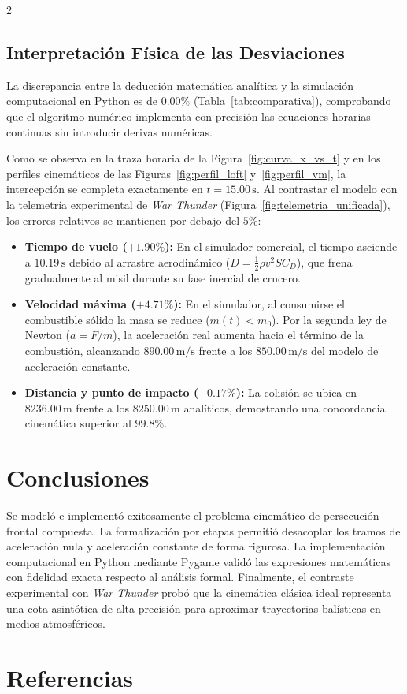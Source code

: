 \documentclass[11pt,letterpaper]{article}
\begin{document}
\begin{multicols}{2}

\subsection{Interpretación Física de las Desviaciones}
La discrepancia entre la deducción matemática analítica y la simulación computacional en Python es de $0.00\%$ (Tabla~\ref{tab:comparativa}), comprobando que el algoritmo numérico implementa con precisión las ecuaciones horarias continuas sin introducir derivas numéricas.

Como se observa en la traza horaria de la Figura~\ref{fig:curva_x_vs_t} y en los perfiles cinemáticos de las Figuras~\ref{fig:perfil_loft} y~\ref{fig:perfil_vm}, la intercepción se completa exactamente en $t = 15.00\,\text{s}$. Al contrastar el modelo con la telemetría experimental de \textit{War Thunder} (Figura~\ref{fig:telemetria_unificada}), los errores relativos se mantienen por debajo del $5\%$:
\begin{itemize}[leftmargin=1.2em]
    \item \textbf{Tiempo de vuelo ($+1.90\%$):} En el simulador comercial, el tiempo asciende a $10.19\,\text{s}$ debido al arrastre aerodinámico ($D = \frac{1}{2}\rho v^2 S C_D$), que frena gradualmente al misil durante su fase inercial de crucero.
    \item \textbf{Velocidad máxima ($+4.71\%$):} En el simulador, al consumirse el combustible sólido la masa se reduce ($m(t) < m_0$). Por la segunda ley de Newton ($a = F/m$), la aceleración real aumenta hacia el término de la combustión, alcanzando $890.00\,\text{m/s}$ frente a los $850.00\,\text{m/s}$ del modelo de aceleración constante.
    \item \textbf{Distancia y punto de impacto ($-0.17\%$):} La colisión se ubica en $8236.00\,\text{m}$ frente a los $8250.00\,\text{m}$ analíticos, demostrando una concordancia cinemática superior al $99.8\%$.
\end{itemize}

\section{Conclusiones}

Se modeló e implementó exitosamente el problema cinemático de persecución frontal compuesta. La formalización por etapas permitió desacoplar los tramos de aceleración nula y aceleración constante de forma rigurosa. La implementación computacional en Python mediante Pygame validó las expresiones matemáticas con fidelidad exacta respecto al análisis formal. Finalmente, el contraste experimental con \textit{War Thunder} probó que la cinemática clásica ideal representa una cota asintótica de alta precisión para aproximar trayectorias balísticas en medios atmosféricos.

\section{Referencias}

\printbibliography[heading=none]

\end{multicols}
\end{document}
